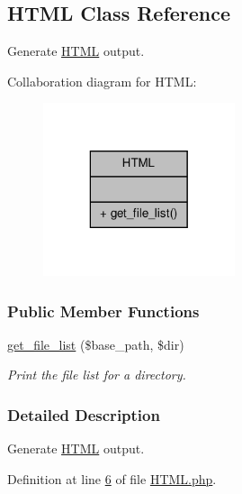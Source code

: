 \hypertarget{classHTML}{\subsection{H\-T\-M\-L Class Reference}
\label{classHTML}
}


Generate \hyperlink{classHTML}{H\-T\-M\-L} output.  




Collaboration diagram for H\-T\-M\-L\-:\nopagebreak
\begin{figure}[H]
\begin{center}
\leavevmode
\includegraphics[width=160pt]{classHTML__coll__graph}
\end{center}
\end{figure}
\subsubsection*{Public Member Functions}
\begin{DoxyCompactItemize}
\item 
\hyperlink{classHTML_ad9045b6ccdf9e6c7e3b4c228772a74f9}{get\-\_\-file\-\_\-list} (\$base\-\_\-path, \$dir)
\begin{DoxyCompactList}\small\item\em Print the file list for a directory. \end{DoxyCompactList}\end{DoxyCompactItemize}


\subsubsection{Detailed Description}
Generate \hyperlink{classHTML}{H\-T\-M\-L} output. 

Definition at line \hyperlink{HTML_8php_source_l00006}{6} of file \hyperlink{HTML_8php_source}{H\-T\-M\-L.\-php}.




